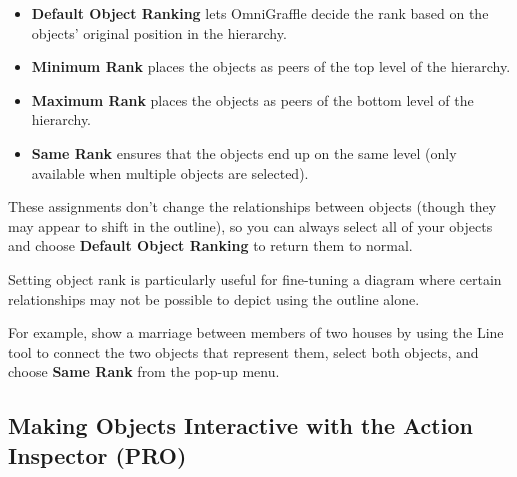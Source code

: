 \documentclass[../main.tex]{subfiles}
\begin{document}
\begin{itemize}
    \begin{itemize}
      \item \textbf{Default Object Ranking} lets OmniGraffle decide the rank based on the objects'
        original position in the hierarchy.
      \item \textbf{Minimum Rank} places the objects as peers of the top level of the hierarchy.
      \item \textbf{Maximum Rank} places the objects as peers of the bottom level of the
        hierarchy.
      \item \textbf{Same Rank} ensures that the objects end up on the same level (only available
        when multiple objects are selected).
    \end{itemize}

    These assignments don't change the relationships between objects (though they may appear to
    shift in the outline), so you can always select all of your objects and choose
    \textbf{Default Object Ranking} to return them to normal.
\end{itemize}

\begin{ogtip}
  Setting object rank is particularly useful for fine-tuning a diagram where certain relationships
  may not be possible to depict using the outline alone.

  For example, show a marriage between members of two houses by using the Line tool to connect
  the two objects that represent them, select both objects, and choose \textbf{Same Rank} from
  the pop-up menu.
\end{ogtip}

\subsection{Making Objects Interactive with the Action Inspector
(\texorpdfstring{\textbf{PRO}}{PRO})}
\end{document}
